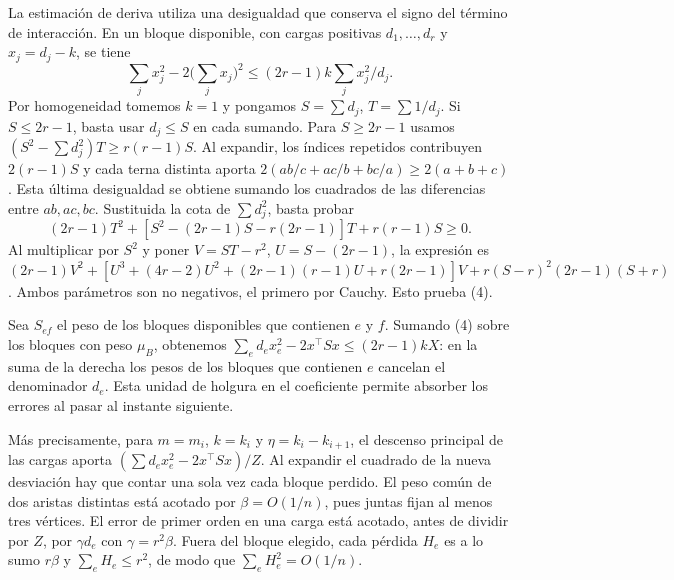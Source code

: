 \documentclass[spanish,11pt,a4paper]{article}
\begin{document}
La estimación de deriva utiliza una desigualdad que conserva el signo del término de interacción. En un bloque disponible, con cargas positivas \(d_1,\ldots,d_r\) y \(x_j=d_j-k\), se tiene \[\sum_j x_j^2-2\Big(\sum_j x_j\Big)^2
       \le (2r-1)k\sum_j x_j^2/d_j . \tag{4}\] Por homogeneidad tomemos \(k=1\) y pongamos \(S=\sum d_j\), \(T=\sum 1/d_j\). Si \(S\le2r-1\), basta usar \(d_j\le S\) en cada sumando. Para \(S\ge2r-1\) usamos \((S^2-\sum d_j^2)T\ge r(r-1)S\). Al expandir, los índices repetidos contribuyen \(2(r-1)S\) y cada terna distinta aporta \(2(ab/c+ac/b+bc/a)\ge2(a+b+c)\). Esta última desigualdad se obtiene sumando los cuadrados de las diferencias entre \(ab,ac,bc\). Sustituida la cota de \(\sum d_j^2\), basta probar \[(2r-1)T^2+[S^2-(2r-1)S-r(2r-1)]T+r(r-1)S\ge0.\] Al multiplicar por \(S^2\) y poner \(V=ST-r^2\), \(U=S-(2r-1)\), la expresión es \((2r-1)V^2+[U^3+(4r-2)U^2+(2r-1)(r-1)U+r(2r-1)]V+r(S-r)^2(2r-1)(S+r)\). Ambos parámetros son no negativos, el primero por Cauchy. Esto prueba (4).

Sea \(S_{ef}\) el peso de los bloques disponibles que contienen \(e\) y \(f\). Sumando (4) sobre los bloques con peso \(\mu_B\), obtenemos \(\sum_e d_ex_e^2-2x^\top Sx\le(2r-1)kX\): en la suma de la derecha los pesos de los bloques que contienen \(e\) cancelan el denominador \(d_e\). Esta unidad de holgura en el coeficiente permite absorber los errores al pasar al instante siguiente.

Más precisamente, para \(m=m_i\), \(k=k_i\) y \(\eta=k_i-k_{i+1}\), el descenso principal de las cargas aporta \((\sum d_ex_e^2-2x^\top Sx)/Z\). Al expandir el cuadrado de la nueva desviación hay que contar una sola vez cada bloque perdido. El peso común de dos aristas distintas está acotado por \(\beta=O(1/n)\), pues juntas fijan al menos tres vértices. El error de primer orden en una carga está acotado, antes de dividir por \(Z\), por \(\gamma d_e\) con \(\gamma=r^2\beta\). Fuera del bloque elegido, cada pérdida \(H_e\) es a lo sumo \(r\beta\) y \(\sum_e H_e\le r^2\), de modo que \(\sum_e H_e^2=O(1/n)\).
\end{document}
